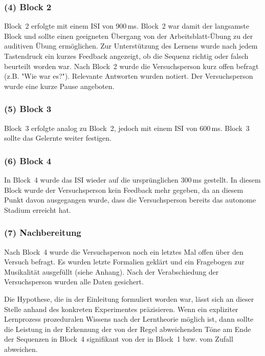 \documentclass[doc,a4paper,12pt]{apa6}
\begin{document}
\subsubsection{(4) Block 2}

Block~2 erfolgte mit einem ISI von 900\,ms. Block~2 war damit der langsamste Block und sollte einen geeigneten Übergang von der Arbeitsblatt-Übung zu der auditiven Übung ermöglichen. Zur Unterstützung des Lernens wurde nach jedem Tastendruck ein kurzes Feedback angezeigt, ob die Sequenz richtig oder falsch beurteilt worden war. Nach Block~2 wurde die Versuchsperson kurz offen befragt (z.B. "Wie war es?"). Relevante Antworten wurden notiert. Der Versuchsperson wurde eine kurze Pause angeboten.

\subsubsection{(5) Block 3}

Block~3 erfolgte analog zu Block~2, jedoch mit einem ISI von 600\,ms. Block~3 sollte das Gelernte weiter festigen.

\subsubsection{(6) Block 4}

In Block~4 wurde das ISI wieder auf die ursprünglichen 300\,ms gestellt. In diesem Block wurde der Versuchsperson kein Feedback mehr gegeben, da an diesem Punkt davon ausgegangen wurde, dass die Versuchsperson bereits das autonome Stadium erreicht hat.

\subsubsection{(7) Nachbereitung}

Nach Block~4 wurde die Versuchsperson noch ein letztes Mal offen über den Versuch befragt. Es wurden letzte Formalien geklärt und ein Fragebogen zur Musikalität ausgefüllt (siehe Anhang). Nach der Verabschiedung der Versuchsperson wurden alle Daten gesichert.

Die Hypothese, die in der Einleitung formuliert worden war, lässt sich an dieser Stelle anhand des konkreten Experimentes präzisieren. Wenn ein expliziter Lernprozess prozeduralen Wissens nach der Lerntheorie möglich ist, dann sollte die Leistung in der Erkennung der von der Regel abweichenden Töne am Ende der Sequenzen in Block~4 signifikant von der in Block~1 bzw. vom Zufall abweichen.
\end{document}
